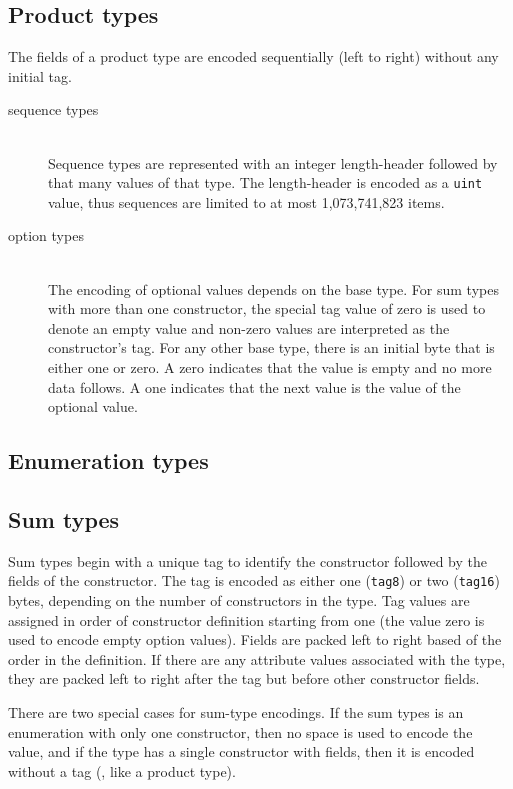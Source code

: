 \subsection{Product types}
The fields of a product type are encoded sequentially (left to right)
without any initial tag.

\begin{description}
  \item[sequence types] \mbox{}\\
    Sequence types are represented with an integer length-header followed by
    that many values of that type.
    The length-header is encoded as a \lstinline!uint! value, thus sequences are limited
    to at most 1,073,741,823 items.

  \item[option types] \mbox{}\\
    The encoding of optional values depends on the base type.
    For sum types with more than one constructor, the special tag value of zero is
    used to denote an empty value and non-zero values are interpreted as
    the constructor's tag.
    For any other base type, there is an initial byte that is either one or zero.
    A zero indicates that the value is empty and no more data follows.
    A one indicates that the next value is the value of the optional value.
\end{description}%

\subsection{Enumeration types}

\subsection{Sum types}
Sum types begin with a unique tag to identify the constructor
followed by the fields of the constructor.
The tag is encoded as either one (\lstinline!tag8!) or two (\lstinline!tag16!)
bytes, depending on the number of constructors in the type.
Tag values are assigned in order of constructor definition starting from one (the
value zero is used to encode empty option values).
Fields are packed left to right based of the order in the definition.
If there are any attribute values associated with the type, they are packed left to right
after the tag but before other constructor fields.
    
There are two special cases for sum-type encodings.
If the sum types is an enumeration with only one constructor, then no space is used to
encode the value, and if the type has a single constructor with fields, then it is
encoded without a tag (\ie{}, like a product type).


